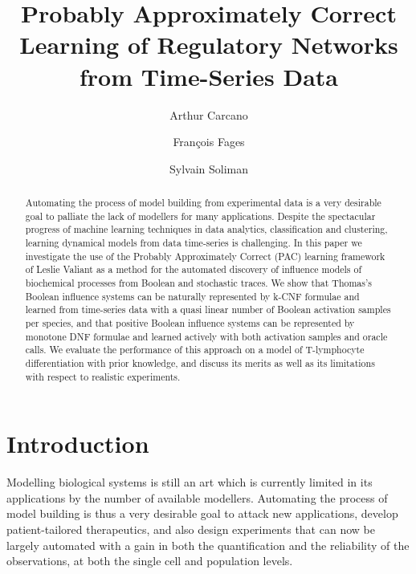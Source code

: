 \documentclass{llncs}
\begin{document}
\title{Probably Approximately Correct Learning of Regulatory Networks from Time-Series Data}

\author{Arthur Carcano \and Fran\c{c}ois Fages \and Sylvain
Soliman}


\maketitle

\begin{abstract}
Automating the process of model building from experimental data 
is a very desirable goal to palliate the lack of modellers for many applications.
Despite the spectacular progress of machine learning techniques in data analytics, classification and clustering,
learning dynamical models from data time-series is challenging.
In this paper we investigate the use of the Probably Approximately Correct (PAC) learning 
framework of Leslie Valiant as a method for the automated discovery of influence models of biochemical processes from Boolean and stochastic traces. 
We show that Thomas's Boolean influence systems can be naturally represented by k-CNF formulae
and learned
from time-series data with a quasi linear number of Boolean activation samples per species,
and that positive Boolean influence systems can be represented by monotone DNF formulae
and learned actively with both activation samples and oracle calls.
We evaluate the performance of this approach on a model of T-lymphocyte differentiation with prior knowledge,
and discuss its merits as well as its limitations with respect to realistic experiments.
\end{abstract}

\section{Introduction}

Modelling biological systems is still an art which is currently limited in its applications by the number of available modellers.
Automating the process of model building is thus a very desirable goal
to attack new applications, develop patient-tailored therapeutics,
and also design experiments that can now be largely automated
with a gain in both the quantification and the reliability of the observations, at both the single cell and population levels.
\end{document}

